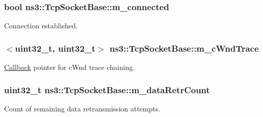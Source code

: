 \subsubsection[{\texorpdfstring{m\+\_\+connected}{m_connected}}]{\setlength{\rightskip}{0pt plus 5cm}bool ns3\+::\+Tcp\+Socket\+Base\+::m\+\_\+connected\hspace{0.3cm}{\ttfamily [protected]}}\hypertarget{classns3_1_1TcpSocketBase_aa52df78102ea7c1c6b432ad9486ed0c2}{}\label{classns3_1_1TcpSocketBase_aa52df78102ea7c1c6b432ad9486ed0c2}


Connection established. 

\subsubsection[{\texorpdfstring{m\+\_\+c\+Wnd\+Trace}{m_cWndTrace}}]{$<$uint32\+\_\+t, uint32\+\_\+t$>$ ns3\+::\+Tcp\+Socket\+Base\+::m\+\_\+c\+Wnd\+Trace}\hypertarget{classns3_1_1TcpSocketBase_a53183f9cee6315bcb73742b9b9d14970}{}\label{classns3_1_1TcpSocketBase_a53183f9cee6315bcb73742b9b9d14970}


\hyperlink{classns3_1_1Callback}{Callback} pointer for c\+Wnd trace chaining. 

\subsubsection[{\texorpdfstring{m\+\_\+data\+Retr\+Count}{m_dataRetrCount}}]{\setlength{\rightskip}{0pt plus 5cm}uint32\+\_\+t ns3\+::\+Tcp\+Socket\+Base\+::m\+\_\+data\+Retr\+Count\hspace{0.3cm}{\ttfamily [protected]}}\hypertarget{classns3_1_1TcpSocketBase_ace7efd32ba5d109037ddd08e128d589d}{}\label{classns3_1_1TcpSocketBase_ace7efd32ba5d109037ddd08e128d589d}


Count of remaining data retransmission attempts. 

